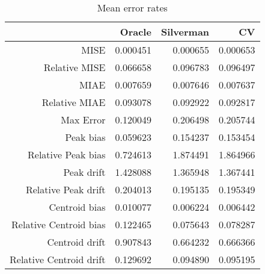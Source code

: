 \begin{table}[ht]
\centering
\begin{tabular}{rrrr}
  \hline
 & Oracle & Silverman & CV \\ 
  \hline
MISE & 0.000451 & 0.000655 & 0.000653 \\ 
  Relative MISE & 0.066658 & 0.096783 & 0.096497 \\ 
  MIAE & 0.007659 & 0.007646 & 0.007637 \\ 
  Relative MIAE & 0.093078 & 0.092922 & 0.092817 \\ 
  Max Error & 0.120049 & 0.206498 & 0.205744 \\ 
  Peak bias & 0.059623 & 0.154237 & 0.153454 \\ 
  Relative Peak bias & 0.724613 & 1.874491 & 1.864966 \\ 
  Peak drift & 1.428088 & 1.365948 & 1.367441 \\ 
  Relative Peak drift & 0.204013 & 0.195135 & 0.195349 \\ 
  Centroid bias & 0.010077 & 0.006224 & 0.006442 \\ 
  Relative Centroid bias & 0.122465 & 0.075643 & 0.078287 \\ 
  Centroid drift & 0.907843 & 0.664232 & 0.666366 \\ 
  Relative Centroid drift & 0.129692 & 0.094890 & 0.095195 \\ 
   \hline
\end{tabular}
\caption{Mean error rates} 
\label{tbl:mean_error_rates}
\end{table}
